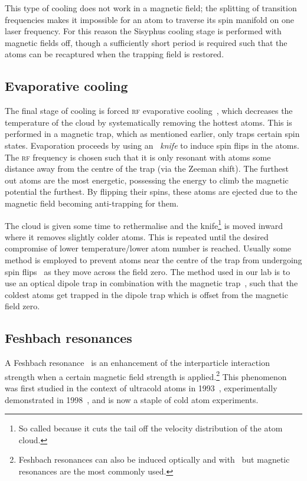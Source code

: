 This type of cooling does not work in a magnetic field; the splitting of transition frequencies makes it impossible for an atom to traverse its spin manifold on one laser frequency. For this reason the Sisyphus cooling stage is performed with magnetic fields off, though a sufficiently short period is required such that the atoms can be recaptured when the trapping field is restored.

\subsection{Evaporative cooling}\label{sec:evaporative_cooling}

The final stage of cooling is forced \textsc{rf} evaporative cooling~\cite{hess_evaporative_1986, anderson_observation_1995}, which decreases the temperature of the cloud by systematically removing the hottest atoms. This is performed in a magnetic trap, which as mentioned earlier, only traps certain spin states. Evaporation proceeds by using an \emph{\rf\ knife} to induce spin flips in the atoms. The \textsc{rf} frequency is chosen such that it is only resonant with atoms some distance away from the centre of the trap (via the Zeeman shift). The furthest out atoms are the most energetic, possessing the energy to climb the magnetic potential the furthest. By flipping their spins, these atoms are ejected due to the magnetic field becoming anti-trapping for them.

The cloud is given some time to rethermalise and the knife\footnote{So called because it cuts the tail off the velocity distribution of the atom cloud.} is moved inward where it removes slightly colder atoms. This is repeated until the desired compromise of lower temperature/lower atom number is reached. Usually some method is employed to prevent atoms near the centre of the trap from undergoing spin flips~\cite{brink_majorana_2006} as they move across the field zero. The method used in our lab is to use an optical dipole trap in combination with the magnetic trap~\cite{lin_rapid_2009}, such that the coldest atoms get trapped in the dipole trap which is offset from the magnetic field zero.

\subsection{Feshbach resonances}\label{sec:feshbach}

A Feshbach resonance~\cite{chin_feshbach_2010} is an enhancement of the interparticle interaction strength when a certain magnetic field strength is applied.\footnote{Feshbach resonances can also be induced optically and with \rf\, but magnetic resonances are the most commonly used.} This phenomenon was first studied in the context of ultracold atoms in 1993~\cite{tiesinga_threshold_1993}, experimentally demonstrated in 1998~\cite{inouye_observation_1998}, and is now a staple of cold atom experiments.

